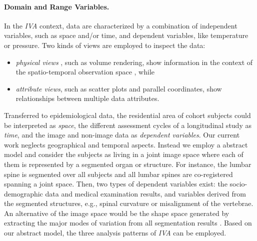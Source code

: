 \documentclass[journal]{style/vgtc} 			          %
\begin{document}
\paragraph{Domain and Range Variables. }
In the \emph{IVA} context, data are characterized by a combination of independent variables, such as space and/or time, and dependent variables, like temperature or pressure.
%
Two kinds of views are employed to inspect the data:
\begin{itemize} 
	\item \emph{physical views} \cite{Oeltze2013}, such as volume rendering, show information in the context of the spatio-temporal observation space \cite{Oeltze2007}, while
	\item \emph{attribute views}, such as scatter plots and parallel coordinates, show relationships between multiple data attributes.
\end{itemize}
Transferred to epidemiological data, the residential area of cohort subjects could be interpreted as \emph{space}, the different assessment cycles of a longitudinal study as \emph{time}, and the image and non-image data as \emph{dependent variables}.
%
Our current work neglects geographical and temporal aspects.
%
Instead we employ a abstract model and consider the subjects as living in a joint image space where each of them is represented by a segmented organ or structure.
%
For instance, the lumbar spine is segmented over all subjects and all lumbar spines are co-registered spanning a joint space.
%
Then, two types of dependent variables exist: the socio-demographic data and medical examination results, and variables derived from the segmented structures, e.g., spinal curvature or misalignment of the vertebrae.
An alternative of the image space would be the shape space generated by extracting the major modes of variation from all segmentation results \cite{Busking2010a}.
%
Based on our abstract model, the three analysis patterns of \emph{IVA} can be employed.
\end{document}
